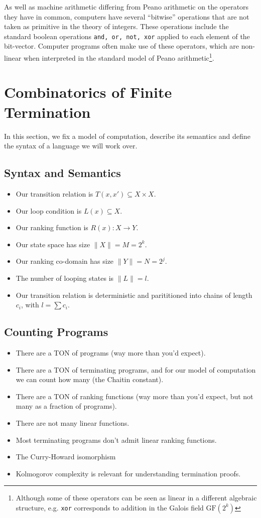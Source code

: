 \documentclass[preprint]{sigplanconf}
\theoremstyle{definition}
\begin{document}
As well as machine arithmetic differing from Peano arithmetic on the operators they have in common,
computers have several ``bitwise'' operations that are not taken as primitive in the theory of
integers.  These operations include the standard boolean operations \texttt{and, or, not, xor}
applied to each element of the bit-vector.  Computer programs often make use of these operators,
which are non-linear when interpreted in the standard model of Peano arithmetic\footnote{
Although some of these operators can be seen as linear in a different algebraic structure,
e.g. \texttt{xor} corresponds to addition in the Galois field $\mathrm{GF}(2^k)$}.

\iffalse
\section{Combinatorics of Finite Termination}
In this section, we fix a model of computation, describe its semantics and
define the syntax of a language we will work over.

\subsection{Syntax and Semantics}

\begin{itemize}
 \item Our transition relation is $T(x, x') \subseteq X \times X$.
 \item Our loop condition is $L(x) \subseteq X$.
 \item Our ranking function is $R(x) : X \to Y$.
 \item Our state space has size $\| X \| = M = 2^k$.
 \item Our ranking co-domain has size $\| Y \| = N = 2^j$.
 \item The number of looping states is $\| L \| = l$.
 \item Our transition relation is deterministic and parititioned into chains of length $c_i$, with $l = \sum c_i$.
\end{itemize}

\subsection{Counting Programs}
\begin{itemize}
 \item There are a TON of programs (way more than you'd expect).
 \item There are a TON of terminating programs, and for our model of computation we can count
  how many (the Chaitin constant).
 \item There are a TON of ranking functions (way more than you'd expect, but not many as a
  fraction of programs).
 \item There are not many linear functions.
 \item Most terminating programs don't admit linear ranking functions.
 \item The Curry-Howard isomorphism
 \item Kolmogorov complexity is relevant for understanding termination proofs.
\end{itemize}
\end{document}
